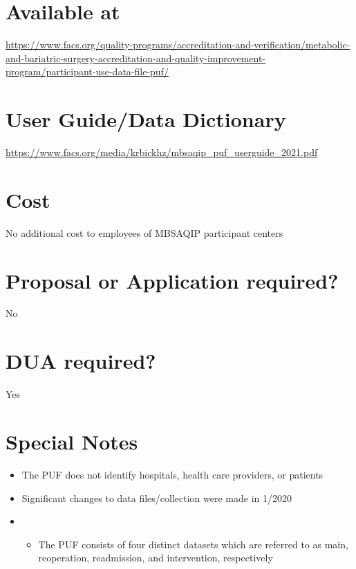 \documentclass[
]{book}
\providecommand{\tightlist}{%
  \setlength{\itemsep}{0pt}\setlength{\parskip}{0pt}}
\begin{document}
\hypertarget{available-at-39}{%
\section{Available at}\label{available-at-39}}

\url{https://www.facs.org/quality-programs/accreditation-and-verification/metabolic-and-bariatric-surgery-accreditation-and-quality-improvement-program/participant-use-data-file-puf/}

\hypertarget{user-guidedata-dictionary-39}{%
\section{User Guide/Data Dictionary}\label{user-guidedata-dictionary-39}}

\url{https://www.facs.org/media/krbickhz/mbsaqip_puf_userguide_2021.pdf}

\hypertarget{cost-39}{%
\section{Cost}\label{cost-39}}

No additional cost to employees of MBSAQIP participant centers

\hypertarget{proposal-or-application-required-39}{%
\section{Proposal or Application required?}\label{proposal-or-application-required-39}}

No

\hypertarget{dua-required-39}{%
\section{DUA required?}\label{dua-required-39}}

Yes

\hypertarget{special-notes-39}{%
\section{Special Notes}\label{special-notes-39}}

\begin{itemize}
\item
  The PUF does not identify hospitals, health care providers, or patients
\item
  Significant changes to data files/collection were made in 1/2020
\item
  \begin{itemize}
  \tightlist
  \item
    The PUF consists of four distinct datasets which are referred to as main, reoperation, readmission, and intervention, respectively
  \end{itemize}
\end{itemize}
\end{document}
